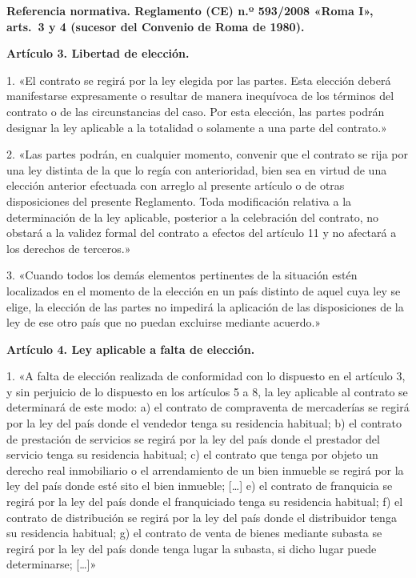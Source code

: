 \documentclass[12pt,oneside]{book}
\begin{document}
\begin{note}
\textbf{Referencia normativa. Reglamento (CE) n.º 593/2008 «Roma I», arts.\ 3 y 4 (sucesor del Convenio de Roma de 1980).}

\textbf{Artículo 3. Libertad de elección.}

1. «El contrato se regirá por la ley elegida por las partes. Esta elección deberá manifestarse expresamente o resultar de manera inequívoca de los términos del contrato o de las circunstancias del caso. Por esta elección, las partes podrán designar la ley aplicable a la totalidad o solamente a una parte del contrato.»

2. «Las partes podrán, en cualquier momento, convenir que el contrato se rija por una ley distinta de la que lo regía con anterioridad, bien sea en virtud de una elección anterior efectuada con arreglo al presente artículo o de otras disposiciones del presente Reglamento. Toda modificación relativa a la determinación de la ley aplicable, posterior a la celebración del contrato, no obstará a la validez formal del contrato a efectos del artículo 11 y no afectará a los derechos de terceros.»

3. «Cuando todos los demás elementos pertinentes de la situación estén localizados en el momento de la elección en un país distinto de aquel cuya ley se elige, la elección de las partes no impedirá la aplicación de las disposiciones de la ley de ese otro país que no puedan excluirse mediante acuerdo.»

\textbf{Artículo 4. Ley aplicable a falta de elección.}

1. «A falta de elección realizada de conformidad con lo dispuesto en el artículo 3, y sin perjuicio de lo dispuesto en los artículos 5 a 8, la ley aplicable al contrato se determinará de este modo: a) el contrato de compraventa de mercaderías se regirá por la ley del país donde el vendedor tenga su residencia habitual; b) el contrato de prestación de servicios se regirá por la ley del país donde el prestador del servicio tenga su residencia habitual; c) el contrato que tenga por objeto un derecho real inmobiliario o el arrendamiento de un bien inmueble se regirá por la ley del país donde esté sito el bien inmueble; [\ldots] e) el contrato de franquicia se regirá por la ley del país donde el franquiciado tenga su residencia habitual; f) el contrato de distribución se regirá por la ley del país donde el distribuidor tenga su residencia habitual; g) el contrato de venta de bienes mediante subasta se regirá por la ley del país donde tenga lugar la subasta, si dicho lugar puede determinarse; [\ldots]»


\end{note}
\end{document}

